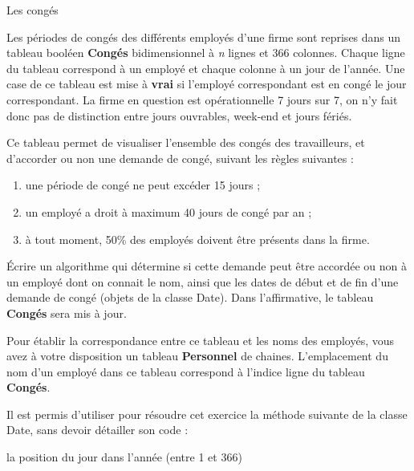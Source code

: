 \begin{Exercice}{Les congés}

	Les périodes de congés des différents employés d’une firme sont reprises
	dans un tableau booléen \textbf{Congés} bidimensionnel à \textit{n}
	lignes et 366 colonnes. Chaque ligne du tableau correspond à un employé
	et chaque colonne à un jour de l’année. Une case de ce tableau est mise
	à \textbf{vrai} si l’employé correspondant est en congé le jour
	correspondant. La firme en question est opérationnelle 7 jours sur 7,
	on n’y fait donc pas de distinction entre jours ouvrables, week-end et
	jours fériés.

	Ce tableau permet de visualiser l’ensemble des congés des travailleurs,
	et d’accorder ou non une demande de congé, suivant les règles suivantes :
	\begin{enumerate}
		\item 
			une période de congé ne peut excéder 15 jours ;
		\item 
			un employé a droit à maximum 40 jours de congé par an ;
		\item 
			à tout moment, 50\% des employés doivent être présents dans la firme.
	\end{enumerate}
	
	Écrire un algorithme qui détermine si cette demande peut être accordée
	ou non à un employé dont on connait le nom, ainsi que les dates de
	début et de fin d’une demande de congé (objets de la classe Date). Dans
	l’affirmative, le tableau \textbf{Congés} sera mis à jour.

	Pour établir la correspondance entre ce tableau et les noms des
	employés, vous avez à votre disposition un tableau \textbf{Personnel}
	de chaines. L’emplacement du nom d’un employé dans ce tableau
	correspond à l’indice ligne du tableau \textbf{Congés}.

	Il est permis d’utiliser pour résoudre cet exercice la méthode suivante
	de la classe Date, sans devoir détailler son code :
	
	\begin{LDA}
		\RComment la position du jour dans l’année (entre 1 et 366)
	\end{LDA}
\end{Exercice}

